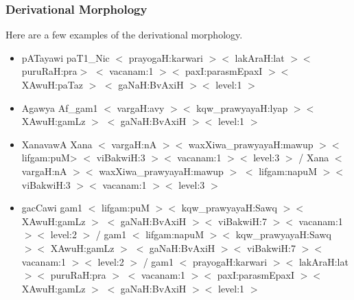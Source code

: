 \documentclass{llncs}
\begin{document}
\begin{itemize}
\subsubsection{Derivational Morphology}
Here are a few examples of the derivational morphology.
\begin{itemize}
\item 
pATayawi	paT1\_Nic $<$ prayogaH:karwari $><$ lakAraH:lat $><$ puruRaH:pra$>$
		$<$ vacanam:1 $><$ paxI:parasmEpaxI $><$ XAwuH:paTaz $>$
		$<$ gaNaH:BvAxiH $><$ level:1 $>$

\item
Agawya   Af\_gam1 $<$ vargaH:avy $><$ kqw\_prawyayaH:lyap $><$ XAwuH:gamLz $>$
	 $<$ gaNaH:BvAxiH $><$ level:1 $>$

\item
XanavawA    Xana $<$ vargaH:nA $><$ waxXiwa\_prawyayaH:mawup $><$ lifgam:puM>
	    $<$ viBakwiH:3 $><$ vacanam:1 $><$ level:3 $>$ /
	    Xana $<$ vargaH:nA $><$ waxXiwa\_prawyayaH:mawup $>$ 
	    $<$ lifgam:napuM $><$ viBakwiH:3 $><$ vacanam:1 $><$ level:3 $>$

\item
gacCawi    gam1 $<$ lifgam:puM $><$ kqw\_prawyayaH:Sawq $><$ XAwuH:gamLz $>$ 
	   $<$ gaNaH:BvAxiH $><$ viBakwiH:7 $><$ vacanam:1 $><$ level:2 $>$ / 
	   gam1 $<$ lifgam:napuM $><$ kqw\_prawyayaH:Sawq $><$ XAwuH:gamLz $>$
	   $<$ gaNaH:BvAxiH $><$ viBakwiH:7 $><$ vacanam:1 $><$ level:2 $>$ / 
	   gam1 $<$ prayogaH:karwari $><$ lakAraH:lat $><$ puruRaH:pra $>$
	   $<$ vacanam:1 $><$ paxI:parasmEpaxI $><$ XAwuH:gamLz $>$ 
	   $<$ gaNaH:BvAxiH $><$ level:1 $>$

\end{itemize}
\end{itemize}
\end{document}
